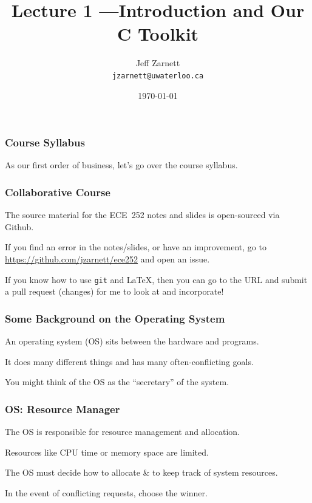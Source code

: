 

\title{Lecture 1 ---Introduction and Our C Toolkit }

\author{Jeff Zarnett \\ \small \texttt{jzarnett@uwaterloo.ca}}
\date{\today}




\begin{frame}
  \titlepage

 \end{frame}

\begin{frame}
\frametitle{Course Syllabus}

As our first order of business, let's go over the course syllabus.

\end{frame}

\begin{frame}
\frametitle{Collaborative Course}

The source material for the ECE~252 notes and slides is open-sourced via Github. 

If you find an error in the notes/slides, or have an improvement, go to \url{https://github.com/jzarnett/ece252} and open an issue. 

If you know how to use \texttt{git} and \LaTeX, then you can go to the URL and submit a pull request (changes) for me to look at and incorporate!


\end{frame}

\begin{frame}
\frametitle{Some Background on the Operating System}

An operating system (OS) sits between the hardware and programs.

It does many different things and has many often-conflicting goals.

You might think of the OS as the ``secretary'' of the system.

\end{frame}

\begin{frame}
\frametitle{OS: Resource Manager}

The OS is responsible for resource management and allocation.

Resources like CPU time or memory space are limited.

The OS must decide how to allocate \& to keep track of system resources.

In the event of conflicting requests, choose the winner.


\end{frame}

